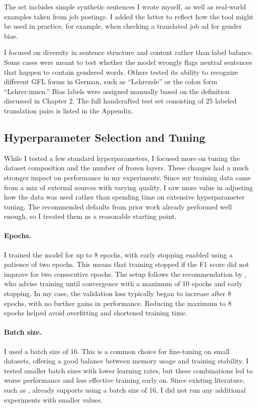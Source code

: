     The set includes simple synthetic sentences I wrote myself, as well as real-world examples taken from job postings. I added the latter to reflect how the tool might be used in practice, for example, when checking a translated job ad for gender bias.

    I focused on diversity in sentence structure and content rather than label balance. Some cases were meant to test whether the model wrongly flags neutral sentences that happen to contain gendered words. Others tested its ability to recognize different GFL forms in German, such as “Lehrende” or the colon form “Lehrer:innen.” Bias labels were assigned manually based on the definition discussed in Chapter 2. The full handcrafted test set consisting of 25 labeled translation pairs is listed in the Appendix.

\subsection{Hyperparameter Selection and Tuning}
     While I tested a few standard hyperparameters, I focused more on tuning the dataset composition and the number of frozen layers. These changes had a much stronger impact on performance in my experiments. Since my training data came from a mix of external sources with varying quality, I saw more value in adjusting how the data was used rather than spending time on extensive hyperparameter tuning. The recommended defaults from prior work already performed well enough, so I treated them as a reasonable starting point.

    \paragraph{Epochs.} I trained the model for up to 8 epochs, with early stopping enabled using a patience of two epochs. This means that training stopped if the F1 score did not improve for two consecutive epochs. The setup follows the recommendation by \textcite{pecherComparingSpecialisedSmall2024}, who advise training until convergence with a maximum of 10 epochs and early stopping. In my case, the validation loss typically began to increase after 8 epochs, with no further gains in performance. Reducing the maximum to 8 epochs helped avoid overfitting and shortened training time.

    \paragraph{Batch size.} I used a batch size of 16. This is a common choice for fine-tuning on small datasets, offering a good balance between memory usage and training stability. I tested smaller batch sizes with lower learning rates, but these combinations led to worse performance and less effective training early on. Since existing literature, such as \textcite{mosbachStabilityFinetuningBERT2021}, already supports using a batch size of 16, I did not run any additional experiments with smaller values.

